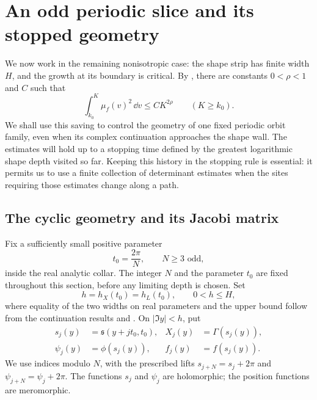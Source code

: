 \section{An odd periodic slice and its stopped geometry}
\label{sec:odd-slice}

We now work in the remaining nonisotropic case: the shape strip has finite
width \(H\), and the growth at its boundary is critical.  By
, there are constants
\(0<\rho<1\) and \(C\) such that
\begin{equation}
 \int_{k_0}^{K}\mu_f(v)^2\,\dd v\le C K^{2\rho}
 \qquad(K\ge k_0).
 \label{odd:angle-budget}
\end{equation}
We shall use this saving to control the geometry of one fixed periodic
orbit family, even when its complex continuation approaches the shape wall.
The estimates will hold up to a stopping time defined by the greatest
logarithmic shape depth visited so far. Keeping this history in the stopping rule is essential:
it permits us to use a finite collection of determinant estimates when the
sites requiring those estimates change along a path.

\subsection{The cyclic geometry and its Jacobi matrix}

Fix a sufficiently small positive parameter
\[
 t_0=\frac{2\pi}{N},\qquad N\ge3\text{ odd},
\]
inside the real analytic collar.  The integer \(N\) and the parameter \(t_0\)
are fixed throughout this section, before any limiting depth is chosen.
Set
\[
 h=h_X(t_0)=h_L(t_0),\qquad 0<h\le H,
\]
where equality of the two widths on real parameters and the upper bound
follow from the continuation results and .
On \(|\Im y|<h\), put
\begin{equation}
 \begin{aligned}
 s_j(y)&=\mathfrak s(y+jt_0,t_0),&
 X_j(y)&=\Gamma(s_j(y)),\\
 \psi_j(y)&=\phi(s_j(y)),&
 f_j(y)&=f(s_j(y)).
 \end{aligned}
 \label{odd:site-data}
\end{equation}
We use indices modulo \(N\), with the prescribed lifts
\(s_{j+N}=s_j+2\pi\) and \(\psi_{j+N}=\psi_j+2\pi\).
The functions \(s_j\) and \(\psi_j\) are holomorphic; the position functions
are meromorphic.

